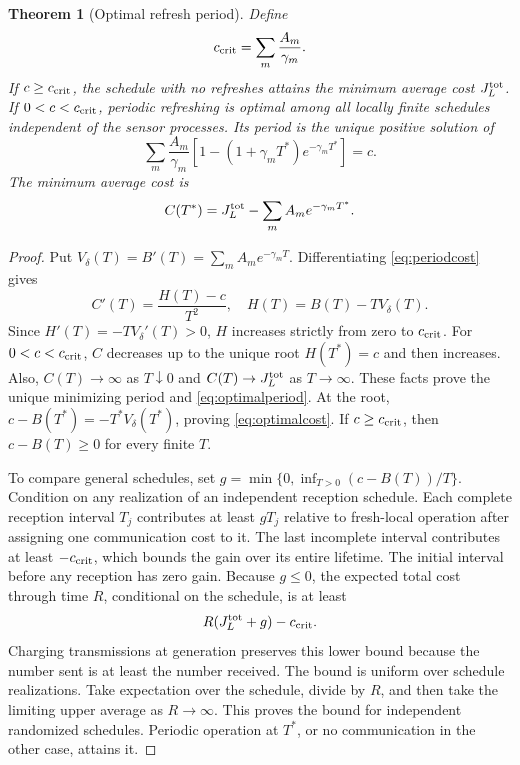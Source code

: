 \documentclass[letterpaper,10pt,conference]{ieeeconf}
\newtheorem{theorem}{Theorem}
\begin{document}
\begin{theorem}[Optimal refresh period]\label{thm:refresh}
Define
\begin{equation}
 c_{\rm crit}=\sum_m\frac{A_m}{\gamma_m}.\label{eq:threshold}
\end{equation}
If $c\ge c_{\rm crit}$, the schedule with no refreshes attains the minimum average cost $J_L^{\rm tot}$. If $0<c<c_{\rm crit}$, periodic refreshing is optimal among all locally finite schedules independent of the sensor processes. Its period is the unique positive solution of
\begin{equation}
 \sum_m\frac{A_m}{\gamma_m}
 [1-(1+\gamma_mT^*)e^{-\gamma_mT^*}]=c.\label{eq:optimalperiod}
\end{equation}
The minimum average cost is
\begin{equation}
 C(T^*)=J_L^{\rm tot}-\sum_m A_m e^{-\gamma_mT^*}.\label{eq:optimalcost}
\end{equation}
\end{theorem}
\begin{proof}
Put $V_\delta(T)=B'(T)=\sum_m A_me^{-\gamma_mT}$. Differentiating \eqref{eq:periodcost} gives
\begin{equation}
 C'(T)=\frac{H(T)-c}{T^2},\quad H(T)=B(T)-TV_\delta(T).\label{eq:derivative}
\end{equation}
Since $H'(T)=-TV_\delta'(T)>0$, $H$ increases strictly from zero to $c_{\rm crit}$. For $0<c<c_{\rm crit}$, $C$ decreases up to the unique root $H(T^*)=c$ and then increases. Also, $C(T)\to\infty$ as $T\downarrow0$ and $C(T)\to J_L^{\rm tot}$ as $T\to\infty$. These facts prove the unique minimizing period and \eqref{eq:optimalperiod}. At the root, $c-B(T^*)=-T^*V_\delta(T^*)$, proving \eqref{eq:optimalcost}. If $c\ge c_{\rm crit}$, then $c-B(T)\ge0$ for every finite $T$.

To compare general schedules, set $g=\min\{0,\inf_{T>0}(c-B(T))/T\}$. Condition on any realization of an independent reception schedule. Each complete reception interval $T_j$ contributes at least $gT_j$ relative to fresh-local operation after assigning one communication cost to it. The last incomplete interval contributes at least $-c_{\rm crit}$, which bounds the gain over its entire lifetime. The initial interval before any reception has zero gain. Because $g\le0$, the expected total cost through time $R$, conditional on the schedule, is at least
\[
 R(J_L^{\rm tot}+g)-c_{\rm crit}.
\]
Charging transmissions at generation preserves this lower bound because the number sent is at least the number received. The bound is uniform over schedule realizations. Take expectation over the schedule, divide by $R$, and then take the limiting upper average as $R\to\infty$. This proves the bound for independent randomized schedules. Periodic operation at $T^*$, or no communication in the other case, attains it.
\end{proof}
\end{document}
